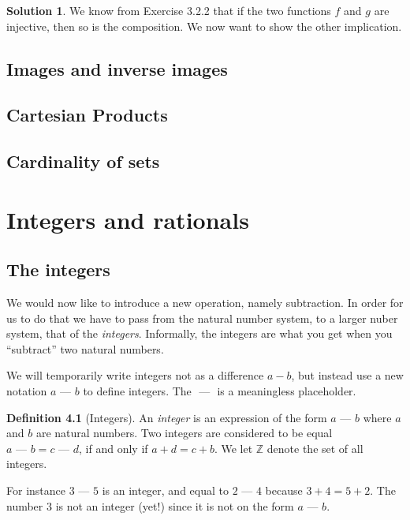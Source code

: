 \documentclass[a4paper, twocolumn]{report}
\newcounter{dummy} \numberwithin{dummy}{section}
\newcounter{exercise} \numberwithin{exercise}{section}
\theoremstyle{definition}
\newtheorem{defn}[dummy]{Definition}
\theoremstyle{solution}
\newtheorem*{sltn}{Solution}
\newcommand{\dash}{\text{ --- }}
\begin{document}
\begin{sltn}
  We know from Exercise 3.2.2 that if the two functions $f$ and $g$ are injective, then so is the composition.
  We now want to show the other implication.

\end{sltn}

\section{Images and inverse images}
\section{Cartesian Products}
\section{Cardinality of sets}

\chapter{Integers and rationals}
\section{The integers}
We would now like to introduce a new operation, namely subtraction. In order
for us to do that we have to pass from the natural number system, to a larger
nuber system, that of the \textit{integers}.  Informally, the integers are what
you get when you ``subtract'' two natural numbers. 

We will temporarily write integers not as a difference $a - b$, but instead use
a new notation $a \dash b$ to define integers.  The $\dash$ is a meaningless
placeholder.

\begin{defn}[Integers]
  \label{defn_411} 
  An \textit{integer} is an expression of the form $a \dash b$ where $a$ and
  $b$ are natural numbers. Two integers are considered to be equal $a \dash b =
  c \dash d$, if and only if $a + d = c + b$. We let $\mathbb{Z}$ denote the
  set of all integers.
\end{defn}

For instance $3 \dash 5$ is an integer, and equal to $2 \dash 4$ because $3 + 4
= 5 + 2$.  The number $3$ is not an integer (yet!) since it is not on the form
$a \dash b$.
\end{document}
